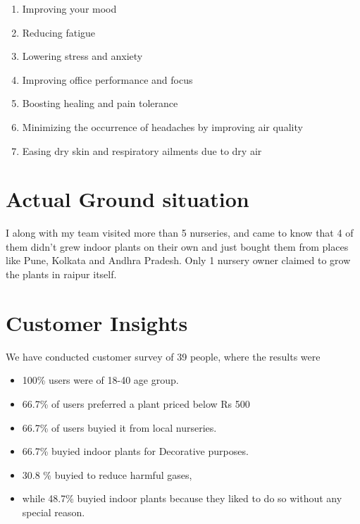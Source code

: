 \documentclass{article}
\begin{document}
\begin{enumerate}

\item Improving your mood

\item Reducing fatigue

\item Lowering stress and anxiety

\item Improving office performance and focus

\item Boosting healing and pain tolerance

\item Minimizing the occurrence of headaches by improving air quality

\item Easing dry skin and respiratory ailments due to dry air

\end{enumerate}


\section*{Actual Ground situation}

I along with my team visited more than 5 nurseries, and came to know that 4 of them didn't grew indoor plants on their own and just bought them from places like Pune, Kolkata and Andhra Pradesh. Only 1 nursery owner claimed to grow the plants in raipur itself.


\section*{Customer Insights}

We have conducted customer survey of 39 people, where the results were\\ 

\begin{itemize}

\item 100\% users were of 18-40 age group.

\item 66.7\% of users preferred a plant priced below Rs 500 \item 66.7\% of users buyied it from local nurseries.

\item 66.7\% buyied indoor plants for Decorative purposes. 
\item 30.8 \% buyied to reduce harmful gases, 
\item while 48.7\% buyied indoor plants because they liked to do so without any special reason.

\end{itemize}
\end{document}
